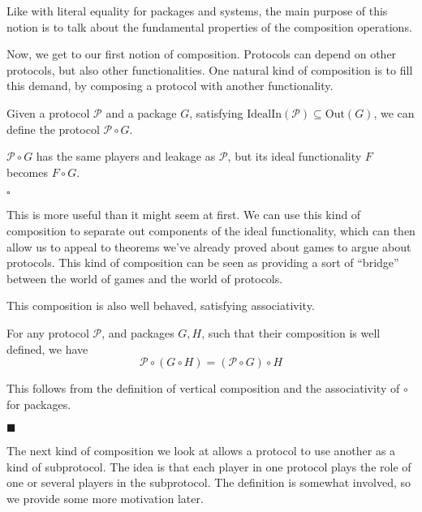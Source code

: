 Like with literal equality for packages and systems, the main purpose
of this notion is to talk about the fundamental properties
of the composition operations.

Now, we get to our first notion of composition.
Protocols can depend on other protocols, but also other functionalities.
One natural kind of composition is to fill this demand,
by composing a protocol with another functionality.

\begin{definition}
Given a protocol $\mathscr{P}$ and a package $G$, satisfying
$\text{IdealIn}(\mathscr{P}) \subseteq \text{Out}(G)$,
we can define the protocol $\mathscr{P} \circ G$.

$\mathscr{P} \circ G$ has the same players and leakage as $\mathscr{P}$,
but its ideal functionality $F$ becomes $F \circ G$.

$\square$
\end{definition}

This is more useful than it might seem at first.
We can use this kind of composition to separate out components
of the ideal functionality, which can then allow us to appeal
to theorems we've already proved about games to argue
about protocols.
This kind of composition can be seen as providing a
sort of ``bridge'' between the world of games and the world of protocols.

This composition is also well behaved, satisfying associativity.

\begin{claim}
For any protocol $\mathscr{P}$, and packages $G, H$, such that their composition
is well defined, we have
$$
\mathscr{P} \circ (G \circ H) = (\mathscr{P} \circ G) \circ H
$$

 This follows from the definition of vertical composition
and the associativity of $\circ$ for packages.

$\blacksquare$
\end{claim}

The next kind of composition we look at allows a protocol
to use another as a kind of subprotocol.
The idea is that each player in one protocol plays the role
of one or several players in the subprotocol.
The definition is somewhat involved, so we provide some more motivation
later.

